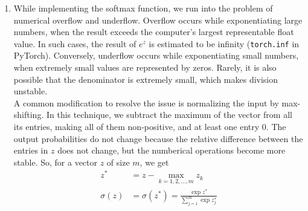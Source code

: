 \documentclass[10pt]{article}
\begin{document}
\begin{enumerate}[label=(\alph*)]
        \item While implementing the softmax function, we run into the problem of numerical overflow
        and underflow. Overflow occurs while exponentiating large numbers, when the result exceeds the
        computer's largest representable float value. In such cases, the result of $e^{z}$ is estimated to be
        infinity (\texttt{torch.inf} in PyTorch). Conversely, underflow occurs while exponentiating small
        numbers, when extremely small values are represented by zeros. Rarely, it is also possible
        that the denominator is extremely small, which makes division unstable. \\
        A common modification to resolve the issue is normalizing the input by max-shifting. In this
        technique, we subtract the maximum of the vector from all its entries, making all of them
        non-positive, and at least one entry 0. The output probabilities do not change because the relative
        difference between the entries in $z$ does not change, but the numberical
        operations become more stable. So, for a vector $z$ of size $m$, we get
        \begin{align*}
            z^{*} &= z - \max_{k = 1, 2, \dots, m}{z_{k}} \\
            \sigma(z) &= \sigma(z^{*}) = \frac{\exp{z^{*}}}{\sum_{j=1}^{m} \exp{z_{j}^{*}}}
        \end{align*}
    \end{enumerate}
\end{document}
